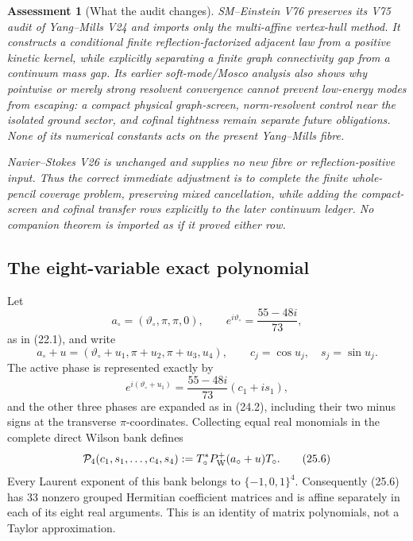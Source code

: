 \documentclass[11pt,oneside]{article}
\newtheorem{assessment}[theorem]{Assessment}
\theoremstyle{definition}
\theoremstyle{remark}
\begin{document}
\begin{assessment}[What the audit changes]
\label{ass:newv25-audit}
SM--Einstein V76 preserves its V75 audit of Yang--Mills V24 and
imports only the multi-affine vertex-hull method.  It constructs a
conditional finite reflection-factorized adjacent law from a
positive kinetic kernel, while explicitly separating a finite graph
connectivity gap from a continuum mass gap.  Its earlier
soft-mode/Mosco analysis also shows why pointwise or merely strong
resolvent convergence cannot prevent low-energy modes from escaping:
a compact physical graph-screen, norm-resolvent control near the
isolated ground sector, and cofinal tightness remain separate future
obligations.  None of its numerical constants acts on the present
Yang--Mills fibre.

Navier--Stokes V26 is unchanged and supplies no new fibre or
reflection-positive input.  Thus the correct immediate adjustment
is to complete the finite whole-pencil coverage problem, preserving
mixed cancellation, while adding the compact-screen and cofinal
transfer rows explicitly to the later continuum ledger.  No
companion theorem is imported as if it proved either row.
\end{assessment}

\subsection{The eight-variable exact polynomial}

Let
\[
 a_\circ=(\vartheta_\circ,\pi,\pi,0),\qquad
 e^{i\vartheta_\circ}=\frac{55-48i}{73},                 \tag{25.3}
\]
as in (22.1), and write
\[
 a_\circ+u
 =(\vartheta_\circ+u_1,\pi+u_2,\pi+u_3,u_4),\qquad
 c_j=\cos u_j,\quad s_j=\sin u_j.                        \tag{25.4}
\]
The active phase is represented exactly by
\[
 e^{i(\vartheta_\circ+u_1)}
 =\frac{55-48i}{73}(c_1+is_1),                           \tag{25.5}
\]
and the other three phases are expanded as in (24.2), including
their two minus signs at the transverse \(\pi\)-coordinates.
Collecting equal real monomials in the complete direct Wilson bank
defines
\[
 {\cal P}_4(c_1,s_1,\ldots,c_4,s_4)
 :=T_\circ^*P_{\mathrm W}^+(a_\circ+u)T_\circ.           \tag{25.6}
\]
Every Laurent exponent of this bank belongs to
\(\{-1,0,1\}^4\).  Consequently (25.6) has \(33\) nonzero grouped
Hermitian coefficient matrices and is affine separately in each of
its eight real arguments.  This is an identity of matrix
polynomials, not a Taylor approximation.
\end{document}
